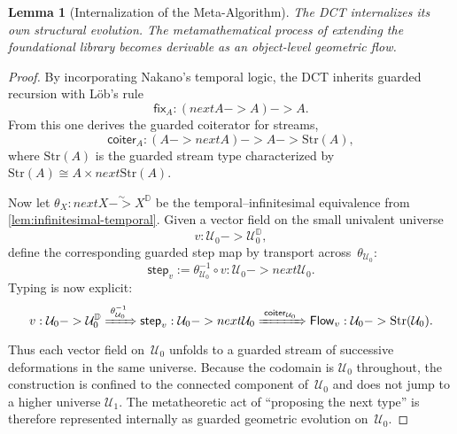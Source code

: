 \documentclass[11pt,a4paper]{article}
\def\to{->}%
\def\bigcirc{next}%
\theoremstyle{plain}
\newtheorem{lemma}[theorem]{Lemma}
\theoremstyle{definition}
\theoremstyle{remark}
\newcommand{\D}{\mathbb{D}}
\newcommand{\U}{\mathcal{U}}
\begin{document}
\begin{lemma}[Internalization of the Meta-Algorithm]
\label{lem:internalization}
The DCT internalizes its own structural evolution.  The metamathematical process of extending the foundational library becomes derivable as an object-level geometric flow.
\end{lemma}
\begin{proof}
By incorporating Nakano's temporal logic, the DCT inherits guarded recursion with L\"ob's rule
\[
  \mathsf{fix}_A : (\bigcirc A \to A) \to A .
\]
From this one derives the guarded coiterator for streams,
\[
  \mathsf{coiter}_A : (A \to \bigcirc A) \to A \to \mathrm{Str}(A),
\]
where $\mathrm{Str}(A)$ is the guarded stream type characterized by $\mathrm{Str}(A) \cong A \times \bigcirc \mathrm{Str}(A)$.

Now let $\theta_X : \bigcirc X \overset{\sim}{\to} X^\D$ be the temporal--infinitesimal equivalence from \cref{lem:infinitesimal-temporal}.
Given a vector field on the small univalent universe
\[
  v : \U_0 \to \U_0^\D,
\]
define the corresponding guarded step map by transport across~$\theta_{\U_0}$:
\[
  \mathsf{step}_v := \theta_{\U_0}^{-1} \circ v : \U_0 \to \bigcirc \U_0 .
\]
Typing is now explicit:
\[
  v : \U_0 \to \U_0^\D
  \xRightarrow{\;\theta_{\U_0}^{-1}\;}
  \mathsf{step}_v : \U_0 \to \bigcirc \U_0
  \xRightarrow{\;\mathsf{coiter}_{\U_0}\;}
  \mathsf{Flow}_v : \U_0 \to \mathrm{Str}(\U_0).
\]
Thus each vector field on~$\U_0$ unfolds to a guarded stream of successive deformations in the same universe.
Because the codomain is $\U_0$ throughout, the construction is confined to the connected component of~$\U_0$ and does not jump to a higher universe $\U_1$.
The metatheoretic act of ``proposing the next type'' is therefore represented internally as guarded geometric evolution on~$\U_0$.
\end{proof}
\end{document}

